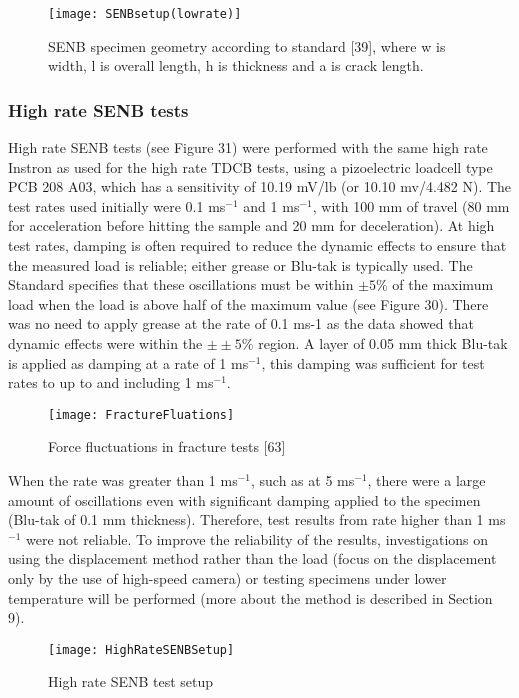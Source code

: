 \documentclass[numbers=noendperiod,chapterprefix=on]{icldt} %
\begin{document}
\begin{figure}[!hp]
\centering
\texttt{[image: SENBsetup(lowrate)]}
\caption{SENB specimen geometry according to standard [39], where w is width, l is overall length, h is thickness and a is crack length.} %
\end{figure}
\FloatBarrier

\subsubsection{High rate SENB tests}
High rate SENB tests (see Figure 31) were performed with the same high rate Instron as used for the high rate TDCB tests, using a pizoelectric loadcell type PCB 208 A03, which has a sensitivity of 10.19 mV/lb (or 10.10 mv/4.482 N).
The test rates used initially were 0.1 ms$^{-1}$ and 1 ms$^{-1}$, with 100 mm of travel (80 mm for acceleration before hitting the sample and 20 mm for deceleration). At high test rates, damping is often required to reduce the dynamic effects to ensure that the measured load is reliable; either grease or Blu-tak is typically used. The Standard specifies that these oscillations must be within $\pm5\%$ of the maximum load when the load is above half of the maximum value (see Figure 30). There was no need to apply grease at the rate of 0.1 ms-1 as the data showed that dynamic effects were within the $\pm±5\%$ region. A layer of 0.05 mm thick Blu-tak is applied as damping at a rate of 1 ms$^{-1}$, this damping was sufficient for test rates to up to and including 1 ms$^{-1}$.

\begin{figure}[!htpb]
\centering
\texttt{[image: FractureFluations]}
\caption{Force fluctuations in fracture tests [63]} %
\end{figure}
\FloatBarrier
When the rate was greater than 1 ms$^{-1}$, such as at 5 ms$^{-1}$, there were a large amount of oscillations even with significant damping applied to the specimen (Blu-tak of 0.1 mm thickness). Therefore, test results from rate higher than 1 ms$^{-1}$ were not reliable. To improve the reliability of the results, investigations on using the displacement method rather than the load (focus on the displacement only by the use of high-speed camera) or testing specimens under lower temperature will be performed (more about the method is described in Section 9). 

\begin{figure}[!htpb]
\centering
\texttt{[image: HighRateSENBSetup]}
\caption{High rate SENB test setup } %
\end{figure}
\FloatBarrier
\end{document}
